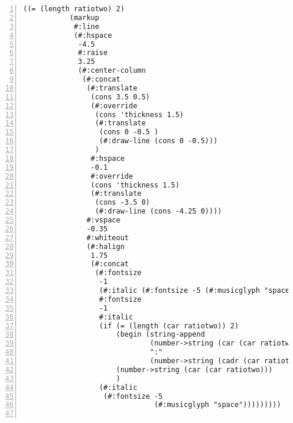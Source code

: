 \begin{Verbatim}[numbers=left,xleftmargin=5mm]
          ((= (length ratiotwo) 2)
           (markup
            #:line
            (#:hspace
             -4.5
             #:raise
             3.25
             (#:center-column
              (#:concat
               (#:translate
                (cons 3.5 0.5)
                (#:override
                 (cons 'thickness 1.5)
                 (#:translate
                  (cons 0 -0.5 )
                  (#:draw-line (cons 0 -0.5)))
                 )
                #:hspace
                -0.1
                #:override
                (cons 'thickness 1.5)
                (#:translate
                 (cons -3.5 0)
                 (#:draw-line (cons -4.25 0))))
               #:vspace
               -0.35
               #:whiteout
               (#:halign
                1.75
                (#:concat
                 (#:fontsize
                  -1
                  (#:italic (#:fontsize -5 (#:musicglyph "space")))
                  #:fontsize
                  -1
                  #:italic
                  (if (= (length (car ratiotwo)) 2)
                      (begin (string-append
                              (number->string (car (car ratiotwo)))
                              ":"
                              (number->string (cadr (car ratiotwo)))))
                      (number->string (car (car ratiotwo)))
                      )
                  (#:italic
                   (#:fontsize -5
                               (#:musicglyph "space")))))))))


\end{Verbatim}
